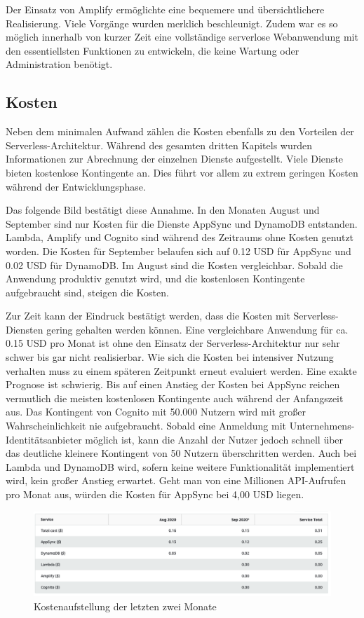 Der Einsatz von Amplify ermöglichte eine bequemere und übersichtlichere Realisierung.
Viele Vorgänge wurden merklich beschleunigt.
Zudem war es so möglich innerhalb von kurzer Zeit eine vollständige serverlose Webanwendung mit den essentiellsten Funktionen zu entwickeln, die keine Wartung oder Administration benötigt.
\clearpage

\subsection{Kosten}
\label{Kosten}
Neben dem minimalen Aufwand zählen die Kosten ebenfalls zu den Vorteilen der Serverless-Architektur.
Während des gesamten dritten Kapitels wurden Informationen zur Abrechnung der einzelnen Dienste aufgestellt.
Viele Dienste bieten kostenlose Kontingente an.
Dies führt vor allem zu extrem geringen Kosten während der Entwicklungsphase.

Das folgende Bild bestätigt diese Annahme.
In den Monaten August und September sind nur Kosten für die Dienste AppSync und DynamoDB entstanden.
Lambda, Amplify und Cognito sind während des Zeitraums ohne Kosten genutzt worden.
Die Kosten für September belaufen sich auf 0.12 USD für AppSync und 0.02 USD für DynamoDB.
Im August sind die Kosten vergleichbar.
Sobald die Anwendung produktiv genutzt wird, und die kostenlosen Kontingente aufgebraucht sind, steigen die Kosten.

Zur Zeit kann der Eindruck bestätigt werden, dass die Kosten mit Serverless-Diensten gering gehalten werden können.
Eine vergleichbare Anwendung für ca. 0.15 USD pro Monat ist ohne den Einsatz der Serverless-Architektur nur sehr schwer bis gar nicht realisierbar.
Wie sich die Kosten bei intensiver Nutzung verhalten muss zu einem späteren Zeitpunkt erneut evaluiert werden.
Eine exakte Prognose ist schwierig.
Bis auf einen Anstieg der Kosten bei AppSync reichen vermutlich die meisten kostenlosen Kontingente auch während der Anfangszeit aus.
Das Kontingent von Cognito mit 50.000 Nutzern wird mit großer Wahrscheinlichkeit nie aufgebraucht.
Sobald eine Anmeldung mit Unternehmens-Identitätsanbieter möglich ist, kann die Anzahl der Nutzer jedoch schnell über das deutliche kleinere Kontingent von 50 Nutzern überschritten werden.
Auch bei Lambda und DynamoDB wird, sofern keine weitere Funktionalität implementiert wird, kein großer Anstieg erwartet.
Geht man von eine Millionen API-Aufrufen pro Monat aus, würden die Kosten für AppSync bei 4,00 USD liegen.
\\
\begin{figure}[htbp]
    \centering
    \includegraphics[width=1.0\textwidth]{50-Implementierung/Kosten.png}
    \caption{Kostenaufstellung der letzten zwei Monate}
    \label{fig:kosten}
\end{figure}
\clearpage

